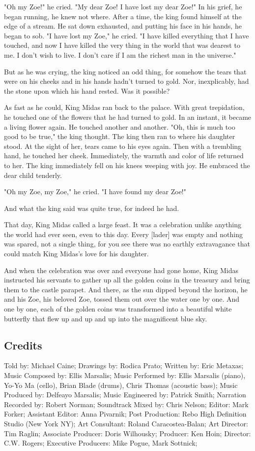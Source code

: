 "Oh my Zoe!" he cried. "My dear Zoe! I have lost my dear Zoe!" In his grief, he began running, he knew not where. After a time, the king found himself at the edge of a stream. He sat down exhausted, and putting his face in his hands, he began to sob. "I have lost my Zoe," he cried. "I have killed everything that I have touched, and now I have killed the very thing in the world that was dearest to me. I don't wish to live. I don't care if I am the richest man in the universe."

But as he was crying, the king noticed an odd thing, for somehow the tears that were on his cheeks and in his hands hadn't turned to gold. Nor, inexplicably, had the stone upon which his hand rested. Was it possible?

As fast as he could, King Midas ran back to the palace. With great trepidation, he touched one of the flowers that he had turned to gold. In an instant, it became a living flower again. He touched another and another. "Oh, this is much too good to be true," the king thought. The king then ran to where his daughter stood. At the sight of her, tears came to his eyes again. Then with a trembling hand, he touched her cheek. Immediately, the warmth and color of life returned to her. The king immediately fell on his knees weeping with joy. He embraced the dear child tenderly.

"Oh my Zoe, my Zoe," he cried. "I have found my dear Zoe!"

And what the king said was quite true, for indeed he had.

That day, King Midas called a large feast. It was a celebration unlike anything the world had ever seen, even to this day. Every [lader] was empty and nothing was spared, not a single thing, for you see there was no earthly extravagance that could match King Midas's love for his daughter.

And when the celebration was over and everyone had gone home, King Midas instructed his servants to gather up all the golden coins in the treasury and bring them to the castle parapet. And there, as the sun dipped beyond the horizon, he and his Zoe, his beloved Zoe, tossed them out over the water one by one. And one by one, each of the golden coins was transformed into a beautiful white butterfly that flew up and up and up into the magnificent blue sky.

\subsection{Credits}

Told by: Michael Caine;
Drawings by: Rodica Prato;
Written by: Eric Metaxas;
Music Composed by: Ellis Marsalis;
Music Performed by: Ellis Marsalis (piano), Yo-Yo Ma (cello), Brian Blade (drums), Chris Thomas (acoustic bass);
Music Produced by: Delfeayo Marsalis;
Music Engineered by: Patrick Smith;
Narration Recorded by: Robert Norman;
Soundtrack Mixed by: Chris Nelson;
Editor: Mark Forker;
Assistant Editor: Anna Pivarnik;
Post Production: Rebo High Definition Studio (New York NY);
Art Consultant: Roland Caracostea-Balan;
Art Director: Tim Raglin;
Associate Producer: Doris Wilhousky;
Producer: Ken Hoin;
Director: C.W. Rogers;
Executive Producers: Mike Pogue, Mark Sottnick;